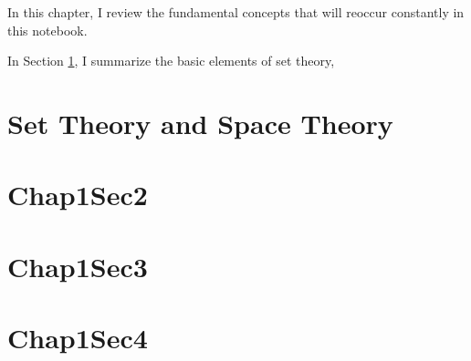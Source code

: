 \minitoc

\vspace{0.5cm}
In this chapter, I review the fundamental concepts that will reoccur constantly in this notebook.

In Section \ref{chap1:set_space}, I summarize the basic elements of set theory, 

\section{Set Theory and Space Theory}\label{chap1:set_space}


\section{Chap1Sec2}\label{chap1:sec2}


\section{Chap1Sec3}\label{chap1:sec3}

\section{Chap1Sec4}\label{chap1:sec4}

